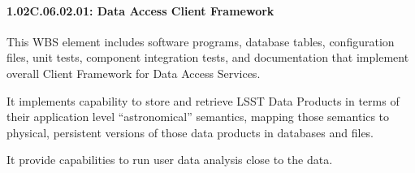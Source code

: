 \paragraph{1.02C.06.02.01: Data Access Client Framework}

This WBS element includes software programs, database tables, configuration files, unit tests, component integration tests, and documentation that implement overall Client Framework for Data Access Services.

It implements capability to store and retrieve LSST Data Products in terms of their application level ``astronomical'' semantics, mapping those semantics to physical, persistent versions of those data products in databases and files.

It provide capabilities to run user data analysis close to the data.
